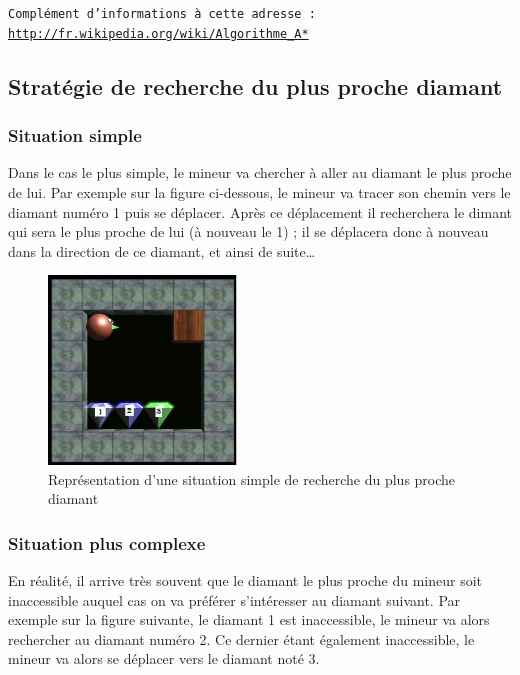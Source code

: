 \documentclass[a4paper,11pt]{article}
\begin{document}
\begin{center}
\texttt{Compl\'ement d'informations \`a cette adresse : \url{http://fr.wikipedia.org/wiki/Algorithme_A*}}
\end{center}

	\subsection{Strat\'egie de recherche du plus proche diamant}
	
		\subsubsection{Situation simple}
		
Dans le cas le plus simple, le mineur va chercher \`a aller au diamant le plus proche de lui. Par exemple sur la figure ci-dessous, le mineur va tracer son chemin vers le diamant num\'ero 1 puis se d\'eplacer. Apr\`es ce d\'eplacement il recherchera le dimant qui sera le plus proche de lui (\`a nouveau le 1) ; il se d\'eplacera donc \`a nouveau dans la direction de ce diamant, et ainsi de suite\dots

		\begin{figure}[h]
			\center
			\includegraphics[width=5cm]{simple1}
			\caption{\label{simpleRechercheDiamant} Repr\'esentation d'une situation simple de recherche du plus proche diamant}
		\end{figure}
		
		\subsubsection{Situation plus complexe}
		
En r\'ealit\'e, il arrive tr\`es souvent que le diamant le plus proche du mineur soit inaccessible auquel cas on va pr\'ef\'erer s'int\'eresser au diamant suivant. Par exemple sur la figure suivante, le diamant 1 est inaccessible, le mineur va alors rechercher au diamant num\'ero 2. Ce dernier \'etant \'egalement inaccessible, le mineur va alors se d\'eplacer vers le diamant not\'e 3.
	
\end{document}
